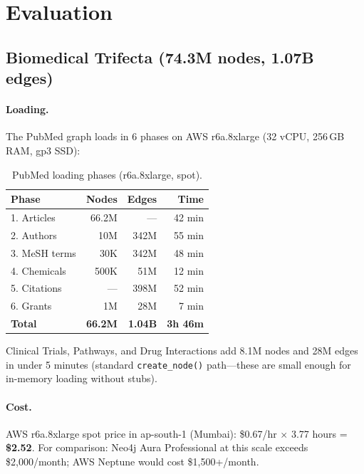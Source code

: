 \documentclass[11pt]{article}
\begin{document}
\section{Evaluation}
\label{sec:eval}

\subsection{Biomedical Trifecta (74.3M nodes, 1.07B edges)}

\paragraph{Loading.} The PubMed graph loads in 6 phases on AWS r6a.8xlarge (32 vCPU, 256\,GB RAM, gp3 SSD):

\begin{table}[H]
  \centering
  \caption{PubMed loading phases (r6a.8xlarge, spot).}
  \label{tab:loading}
  \begin{tabular}{@{}lrrr@{}}
    \toprule
    \textbf{Phase} & \textbf{Nodes} & \textbf{Edges} & \textbf{Time} \\
    \midrule
    1. Articles      & 66.2M &  ---   & 42 min \\
    2. Authors       & 10M   & 342M   & 55 min \\
    3. MeSH terms    & 30K   & 342M   & 48 min \\
    4. Chemicals     & 500K  & 51M    & 12 min \\
    5. Citations     & ---   & 398M   & 52 min \\
    6. Grants        & 1M    & 28M    & 7 min \\
    \midrule
    \textbf{Total}   & \textbf{66.2M} & \textbf{1.04B} & \textbf{3h 46m} \\
    \bottomrule
  \end{tabular}
\end{table}

Clinical Trials, Pathways, and Drug Interactions add 8.1M nodes and 28M edges in under 5 minutes (standard \texttt{create\_node()} path---these are small enough for in-memory loading without stubs).

\paragraph{Cost.} AWS r6a.8xlarge spot price in ap-south-1 (Mumbai): \$0.67/hr $\times$ 3.77 hours = \textbf{\$2.52}. For comparison: Neo4j Aura Professional at this scale exceeds \$2,000/month; AWS Neptune would cost \$1,500+/month.
\end{document}
